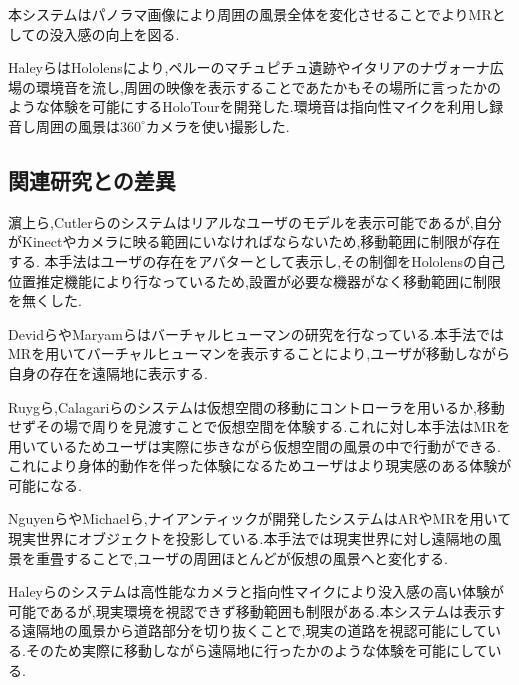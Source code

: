 本システムはパノラマ画像により周囲の風景全体を変化させることでよりMRとしての没入感の向上を図る.

HaleyらはHololensにより,ペルーのマチュピチュ遺跡やイタリアのナヴォーナ広場の環境音を流し,周囲の映像を表示することであたかもその場所に言ったかのような体験を可能にするHoloTourを開発した\cite{holotour}.環境音は指向性マイクを利用し録音し周囲の風景は$360^\circ$カメラを使い撮影した.

\clearpage

\subsection{関連研究との差異}
濵上ら,Cutlerらのシステムはリアルなユーザのモデルを表示可能であるが,自分がKinectやカメラに映る範囲にいなければならないため,移動範囲に制限が存在する.
本手法はユーザの存在をアバターとして表示し,その制御をHololensの自己位置推定機能により行なっているため,設置が必要な機器がなく移動範囲に制限を無くした.

DevidらやMaryamらはバーチャルヒューマンの研究を行なっている.本手法ではMRを用いてバーチャルヒューマンを表示することにより,ユーザが移動しながら自身の存在を遠隔地に表示する.

Ruygら,Calagariらのシステムは仮想空間の移動にコントローラを用いるか,移動せずその場で周りを見渡すことで仮想空間を体験する.これに対し本手法はMRを用いているためユーザは実際に歩きながら仮想空間の風景の中で行動ができる.これにより身体的動作を伴った体験になるためユーザはより現実感のある体験が可能になる.


NguyenらやMichaelら,ナイアンティックが開発したシステムはARやMRを用いて現実世界にオブジェクトを投影している.本手法では現実世界に対し遠隔地の風景を重畳することで,ユーザの周囲ほとんどが仮想の風景へと変化する.

Haleyらのシステムは高性能なカメラと指向性マイクにより没入感の高い体験が可能であるが,現実環境を視認できず移動範囲も制限がある.本システムは表示する遠隔地の風景から道路部分を切り抜くことで,現実の道路を視認可能にしている.そのため実際に移動しながら遠隔地に行ったかのような体験を可能にしている.


